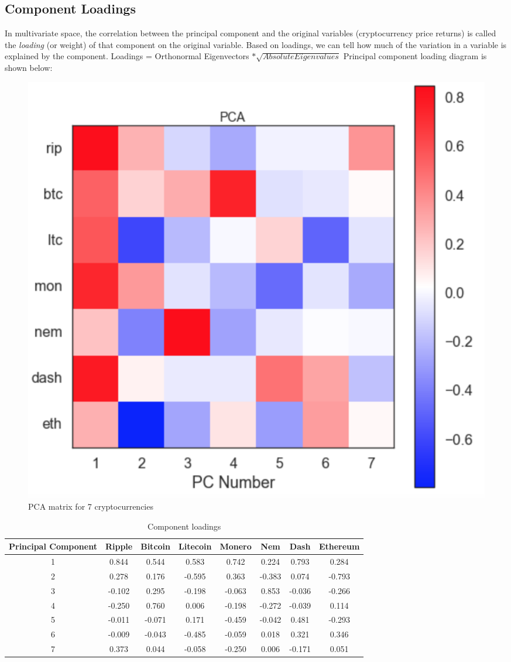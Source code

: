 \documentclass[12pt,twoside]{article}
\newcommand{\head}[1]{\textnormal{\textbf{#1}}}
\begin{document}
\subsection{Component Loadings}
\bigbreak
In multivariate space, the correlation between the principal component and the original variables (cryptocurrency price returns) is called the \textit{loading} (or weight) of that component on the original variable. Based on loadings, we can tell how much of the variation in a variable is explained by the component.
\bigbreak
Loadings = Orthonormal Eigenvectors $* \sqrt{Absolute Eigen values}$
\bigbreak
Principal component loading diagram is shown below:
\begin{figure}[H]
\begin{center}
\includegraphics[scale=.6]{pca_loadings.png}
\end{center}
\caption{PCA matrix for 7 cryptocurrencies}
\end{figure}
\begin{table}[H]
\begin{tabular}{cccccccc}
\hline
\head{Principal Component} & \head{Ripple} & \head{Bitcoin} & \head{Litecoin} &\head{Monero} &\head{Nem} &\head{Dash} &\head{Ethereum}\\
\hline
1 & 0.844&0.544&0.583&0.742&0.224&0.793&0.284\\
2 & 0.278&0.176&-0.595&0.363&-0.383&0.074&-0.793\\
3 & -0.102	&0.295&-0.198&-0.063&0.853&-0.036&-0.266\\
4 & -0.250&0.760&0.006&-0.198&-0.272&-0.039&0.114\\
5 & -0.011	&-0.071&0.171&-0.459&-0.042&0.481&-0.293\\
6 & -0.009&-0.043&-0.485&-0.059&0.018&0.321&0.346\\
7 & 0.373&0.044&-0.058&-0.250&0.006&-0.171&0.051\\
\hline
\end{tabular}
\caption{Component loadings}
\end{table}
\end{document}

